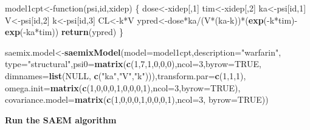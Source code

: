 \documentclass[]{book}
\newenvironment{Shaded}{\begin{snugshade}}{\end{snugshade}}
\newcommand{\KeywordTok}[1]{\textcolor[rgb]{0.13,0.29,0.53}{\textbf{{#1}}}}
\newcommand{\DataTypeTok}[1]{\textcolor[rgb]{0.13,0.29,0.53}{{#1}}}
\newcommand{\DecValTok}[1]{\textcolor[rgb]{0.00,0.00,0.81}{{#1}}}
\newcommand{\StringTok}[1]{\textcolor[rgb]{0.31,0.60,0.02}{{#1}}}
\newcommand{\OtherTok}[1]{\textcolor[rgb]{0.56,0.35,0.01}{{#1}}}
\newcommand{\NormalTok}[1]{{#1}}
\begin{document}
\begin{Shaded}
\begin{Highlighting}[]
\NormalTok{model1cpt<-function(psi,id,xidep) \{}
  \NormalTok{dose<-xidep[,}\DecValTok{1}\NormalTok{]}
  \NormalTok{tim<-xidep[,}\DecValTok{2}\NormalTok{]}
  \NormalTok{ka<-psi[id,}\DecValTok{1}\NormalTok{]}
  \NormalTok{V<-psi[id,}\DecValTok{2}\NormalTok{]}
  \NormalTok{k<-psi[id,}\DecValTok{3}\NormalTok{]}
  \NormalTok{CL<-k*V}
  \NormalTok{ypred<-dose*ka/(V*(ka-k))*(}\KeywordTok{exp}\NormalTok{(-k*tim)-}\KeywordTok{exp}\NormalTok{(-ka*tim))}
  \KeywordTok{return}\NormalTok{(ypred)}
\NormalTok{\}}

\NormalTok{saemix.model<-}\KeywordTok{saemixModel}\NormalTok{(}\DataTypeTok{model=}\NormalTok{model1cpt,}\DataTypeTok{description=}\StringTok{"warfarin"}\NormalTok{,}
  \DataTypeTok{type=}\StringTok{"structural"}\NormalTok{,}\DataTypeTok{psi0=}\KeywordTok{matrix}\NormalTok{(}\KeywordTok{c}\NormalTok{(}\DecValTok{1}\NormalTok{,}\DecValTok{7}\NormalTok{,}\DecValTok{1}\NormalTok{,}\DecValTok{0}\NormalTok{,}\DecValTok{0}\NormalTok{,}\DecValTok{0}\NormalTok{),}\DataTypeTok{ncol=}\DecValTok{3}\NormalTok{,}\DataTypeTok{byrow=}\OtherTok{TRUE}\NormalTok{,}
  \DataTypeTok{dimnames=}\KeywordTok{list}\NormalTok{(}\OtherTok{NULL}\NormalTok{, }\KeywordTok{c}\NormalTok{(}\StringTok{"ka"}\NormalTok{,}\StringTok{"V"}\NormalTok{,}\StringTok{"k"}\NormalTok{))),}\DataTypeTok{transform.par=}\KeywordTok{c}\NormalTok{(}\DecValTok{1}\NormalTok{,}\DecValTok{1}\NormalTok{,}\DecValTok{1}\NormalTok{),}
  \DataTypeTok{omega.init=}\KeywordTok{matrix}\NormalTok{(}\KeywordTok{c}\NormalTok{(}\DecValTok{1}\NormalTok{,}\DecValTok{0}\NormalTok{,}\DecValTok{0}\NormalTok{,}\DecValTok{0}\NormalTok{,}\DecValTok{1}\NormalTok{,}\DecValTok{0}\NormalTok{,}\DecValTok{0}\NormalTok{,}\DecValTok{0}\NormalTok{,}\DecValTok{1}\NormalTok{),}\DataTypeTok{ncol=}\DecValTok{3}\NormalTok{,}\DataTypeTok{byrow=}\OtherTok{TRUE}\NormalTok{),}
  \DataTypeTok{covariance.model=}\KeywordTok{matrix}\NormalTok{(}\KeywordTok{c}\NormalTok{(}\DecValTok{1}\NormalTok{,}\DecValTok{0}\NormalTok{,}\DecValTok{0}\NormalTok{,}\DecValTok{0}\NormalTok{,}\DecValTok{1}\NormalTok{,}\DecValTok{0}\NormalTok{,}\DecValTok{0}\NormalTok{,}\DecValTok{0}\NormalTok{,}\DecValTok{1}\NormalTok{),}\DataTypeTok{ncol=}\DecValTok{3}\NormalTok{,}
  \DataTypeTok{byrow=}\OtherTok{TRUE}\NormalTok{))}
\end{Highlighting}
\end{Shaded}

\textbf{Run the SAEM algorithm}
\end{document}
